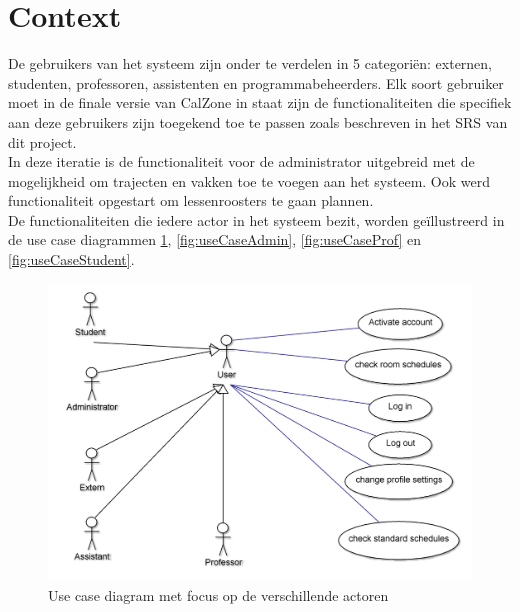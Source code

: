 \section{Context}
\label{sec:context}

De gebruikers van het systeem zijn onder te verdelen in 5 categori\"{e}n: externen, studenten, professoren, assistenten en programmabeheerders. 
Elk soort gebruiker moet in de finale versie van CalZone in staat zijn de functionaliteiten die specifiek aan deze gebruikers zijn toegekend toe te passen zoals beschreven in het SRS\cite{SRS} van dit project. 
\\
In deze iteratie is de functionaliteit voor de administrator uitgebreid met de mogelijkheid om trajecten en vakken toe te voegen aan het systeem.
Ook werd functionaliteit opgestart om lessenroosters te gaan plannen.
\\

De functionaliteiten die iedere actor in het systeem bezit, worden ge\"{i}llustreerd in de use case diagrammen  \ref{fig:useCaseUsers}, \ref{fig:useCaseAdmin}, \ref{fig:useCaseProf} en \ref{fig:useCaseStudent}.

\begin{figure}[H]
	\centering
	\includegraphics[scale=0.2]{img/useCaseUsers}
	\caption{Use case diagram met focus op de verschillende actoren}
	\label{fig:useCaseUsers}
\end{figure}

